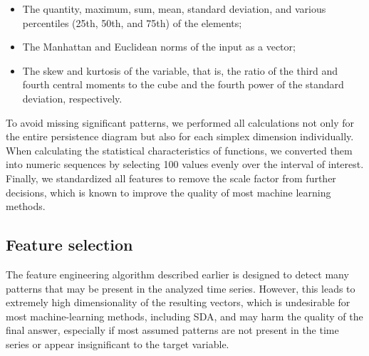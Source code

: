 \documentclass[10pt]{iopart}
\begin{document}
\begin{itemize}
    \item 
        The quantity, maximum, sum, mean, standard deviation, and various percentiles (25th, 50th, and 75th) of the elements;
    \item 
        The Manhattan and Euclidean norms of the input as a vector;
    \item 
        The skew and kurtosis of the variable, that is, the ratio of the third and fourth central moments to the cube and the fourth power of the standard deviation, respectively.
\end{itemize}

To avoid missing significant patterns, we performed all calculations not only for the entire persistence diagram but also for each simplex dimension individually. When calculating the statistical characteristics of functions, we converted them into numeric sequences by selecting 100 values evenly over the interval of interest. Finally, we standardized all features to remove the scale factor from further decisions, which is known to improve the quality of most machine learning methods.

\subsection{Feature selection}

The feature engineering algorithm described earlier is designed to detect many patterns that may be present in the analyzed time series. However, this leads to extremely high dimensionality of the resulting vectors, which is undesirable for most machine-learning methods, including SDA, and may harm the quality of the final answer, especially if most assumed patterns are not present in the time series or appear insignificant to the target variable.
\end{document}
